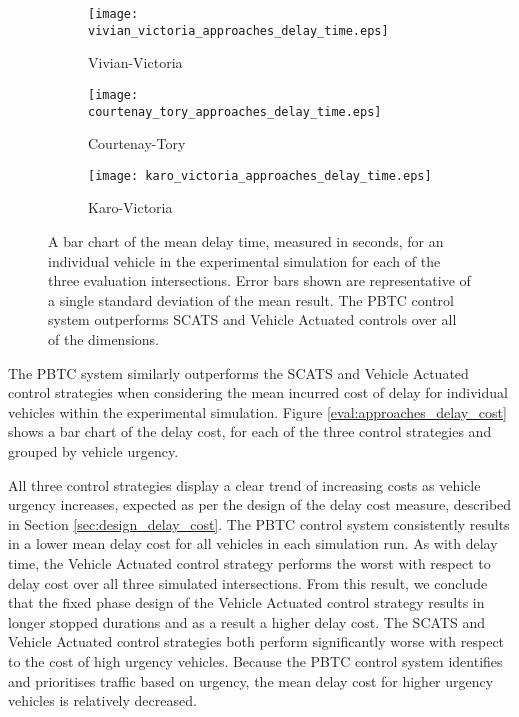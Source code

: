 \begin{figure}
\centering
\begin{subfigure}{.5\textwidth}
  \centering
  \texttt{[image: vivian\_victoria\_approaches\_delay\_time.eps]}
  \caption{Vivian-Victoria}
  \label{approaches_delay_time:sub1}
\end{subfigure}%
\begin{subfigure}{.5\textwidth}
  \centering
  \texttt{[image: courtenay\_tory\_approaches\_delay\_time.eps]}
  \caption{Courtenay-Tory}
  \label{approaches_delay_time:sub2}
\end{subfigure}

\vspace{1cm}

\begin{subfigure}{.5\textwidth}
  \centering
  \texttt{[image: karo\_victoria\_approaches\_delay\_time.eps]}
  \caption{Karo-Victoria}
  \label{approaches_delay_time:sub3}
\end{subfigure}%
\caption[Results of measuring the mean delay time incurred by individual vehicles for each evaluation control strategy and intersection.]{ A bar chart of the mean delay time, measured in seconds, for an individual vehicle in the experimental simulation for each of the three evaluation intersections. Error bars shown are representative of a single standard deviation of the mean result. The PBTC control system outperforms SCATS and Vehicle Actuated controls over all of the dimensions.  }
\label{eval:approaches_delay_time}
\end{figure}

The PBTC system similarly outperforms the SCATS and Vehicle Actuated control strategies when considering the mean incurred cost of delay for individual vehicles within the experimental simulation. Figure \ref{eval:approaches_delay_cost} shows a bar chart of the delay cost, for each of the three control strategies and grouped by vehicle urgency. 

All three control strategies display a clear trend of increasing costs as vehicle urgency increases, expected as per the design of the delay cost measure, described in Section \ref{sec:design_delay_cost}. The PBTC control system consistently results in a lower mean delay cost for all vehicles in each simulation run. As with delay time, the Vehicle Actuated control strategy performs the worst with respect to delay cost over all three simulated intersections. From this result, we conclude that the fixed phase design of the Vehicle Actuated control strategy results in longer stopped durations and as a result a higher delay cost. The SCATS and Vehicle Actuated control strategies both perform significantly worse with respect to the cost of high urgency vehicles. Because the PBTC control system identifies and prioritises traffic based on urgency, the mean delay cost for higher urgency vehicles is relatively decreased.

